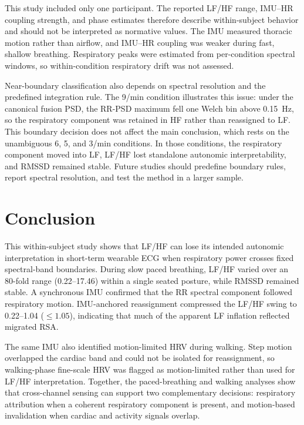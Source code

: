 \documentclass[11pt,a4paper]{article}
\begin{document}
This study included only one participant. The reported LF/HF range,
IMU--HR coupling strength, and phase estimates therefore describe
within-subject behavior and should not be interpreted as normative values.
The IMU measured thoracic motion rather than airflow, and IMU--HR coupling
was weaker during fast, shallow breathing. Respiratory peaks were estimated
from per-condition spectral windows, so within-condition respiratory drift
was not assessed.

Near-boundary classification also depends on spectral resolution and the
predefined integration rule. The 9/min condition illustrates this issue:
under the canonical fusion PSD, the RR-PSD maximum fell one Welch bin above
0.15~Hz, so the respiratory component was retained in HF rather than
reassigned to LF. This boundary decision does not affect the main
conclusion, which rests on the unambiguous 6, 5, and 3/min conditions. In
those conditions, the respiratory component moved into LF, LF/HF lost
standalone autonomic interpretability, and RMSSD remained stable. Future
studies should predefine boundary rules, report spectral resolution, and
test the method in a larger sample.

\section{Conclusion}

This within-subject study shows that LF/HF can lose its intended autonomic
interpretation in short-term wearable ECG when respiratory power crosses
fixed spectral-band boundaries. During slow paced breathing, LF/HF varied
over an 80-fold range (0.22--17.46) within a single seated posture, while
RMSSD remained stable. A synchronous IMU confirmed that the RR spectral
component followed respiratory motion. IMU-anchored reassignment compressed
the LF/HF swing to 0.22--1.04 ($\leq 1.05$), indicating that much of the
apparent LF inflation reflected migrated RSA.

The same IMU also identified motion-limited HRV during walking. Step motion
overlapped the cardiac band and could not be isolated for reassignment, so
walking-phase fine-scale HRV was flagged as motion-limited rather than used
for LF/HF interpretation. Together, the paced-breathing and walking analyses
show that cross-channel sensing can support two complementary decisions:
respiratory attribution when a coherent respiratory component is present,
and motion-based invalidation when cardiac and activity signals overlap.
\end{document}
